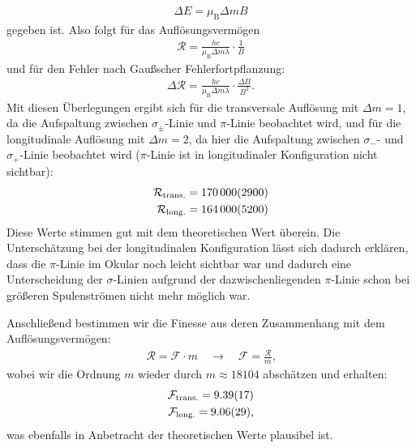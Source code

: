 \documentclass[11pt, a4paper]{article}
\begin{document}
\begin{align}
	\Delta E = \mu_\mathrm{B} \Delta m B
\end{align}
gegeben ist.
Also folgt für das Auflösungsvermögen
\begin{align}
	\mathcal{R} = \frac{h c}{ \mu_\mathrm{B} \Delta m \lambda} \cdot \frac{1}{B} 
\end{align}
und für den Fehler nach Gaußscher Fehlerfortpflanzung:
\begin{align}
	\Delta \mathcal{R} = \frac{h c}{ \mu_\mathrm{B} \Delta m \lambda} \cdot \frac{\Delta B}{B^2} \text{.}
\end{align}
Mit diesen Überlegungen ergibt sich für die transversale Auflösung mit $\Delta m = 1$, da die Aufspaltung zwischen $\sigma_\pm$-Linie und $\pi$-Linie beobachtet wird, und für die longitudinale Auflösung mit $\Delta m = 2$, da hier die Aufspaltung zwischen $\sigma_-$- und $\sigma_+$-Linie beobachtet wird ($\pi$-Linie ist in longitudinaler Konfiguration nicht sichtbar):
\begin{align*}
	\mathcal{R}_\mathrm{trans.} = \num{170000 +- 2900} \\
	\mathcal{R}_\mathrm{long.} =\num{164000 +- 5200}
\end{align*}
Diese Werte stimmen gut mit dem theoretischen Wert überein.
Die Unterschätzung bei der longitudinalen Konfiguration lässt sich dadurch erklären, dass die $\pi$-Linie im Okular noch leicht sichtbar war und dadurch eine Unterscheidung der $\sigma$-Linien aufgrund der dazwischenliegenden $\pi$-Linie schon bei größeren Spulenströmen nicht mehr möglich war.

Anschließend bestimmen wir die Finesse aus deren Zusammenhang mit dem Auflösungsvermögen:
\begin{align*}
\mathcal{R} = \mathcal{F} \cdot m \quad \rightarrow \quad \mathcal{F} = \frac{\mathcal{R}}{m}\text{,}                    
\end{align*}
wobei wir die Ordnung $m$ wieder durch $m \approx \num{18104}$ abschätzen und erhalten:
\begin{align*}
	\mathcal{F}_\mathrm{trans.} = \num{9.39 +- 0.17} \\
	\mathcal{F}_\mathrm{long.} = \num{9.06  +- 0.29}\text{,}
\end{align*}
was ebenfalls in Anbetracht der theoretischen Werte plausibel ist.
\end{document}
